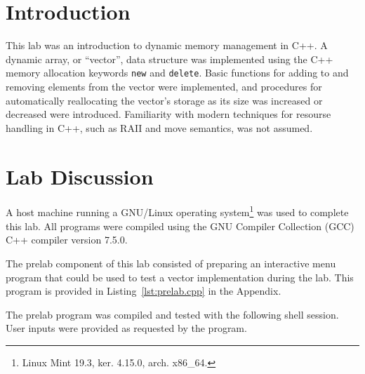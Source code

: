 \documentclass[11pt, letterpaper]{article} %
\begin{document}
\makelabtitle

\section*{Introduction}

This lab was an introduction to dynamic memory management in C++. A dynamic array, or ``vector'', data structure was implemented using the C++ memory allocation keywords \texttt{new} and \texttt{delete}. Basic functions for adding to and removing elements from the vector were implemented, and procedures for automatically reallocating the vector's storage as its size was increased or decreased were introduced. Familiarity with modern techniques for resourse handling in C++, such as RAII and move semantics, was not assumed.

\section*{Lab Discussion} 
A host machine running a GNU/Linux operating system\footnote{Linux Mint 19.3, ker. 4.15.0, arch. x86\_64.}  was used to complete this lab. All programs were compiled using the GNU Compiler Collection (GCC) C++ compiler version 7.5.0.

The prelab component of this lab consisted of preparing an interactive menu program that could be used to test a vector implementation during the lab. This program is provided in Listing~\ref{lst:prelab.cpp} in the Appendix. 

The prelab program was compiled and tested with the following shell session. User inputs were provided as requested by the program.
\end{document}
